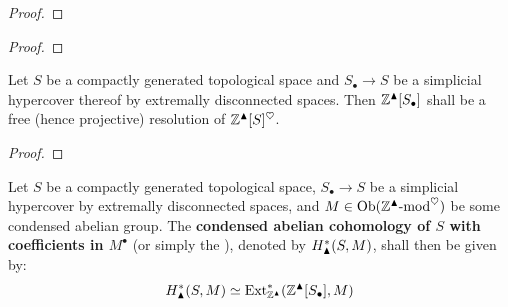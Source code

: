             \begin{lemma} \label{lemma: simplical_hypercovers_of_compacta_by_extremally_disconnected_spaces}
                
            \end{lemma}
                \begin{proof}
                    
                \end{proof}
            \begin{lemma}
                
            \end{lemma}
                \begin{proof}
                    
                \end{proof}
            \begin{proposition} \label{prop: free_resolutions_of_condensed_abelian_groups}
                Let $S$ be a compactly generated topological space and $S_{\bullet} \to S$ be a simplicial hypercover thereof by extremally disconnected spaces. Then $\mathbb{Z}^{\blacktriangle}[S_{\bullet}]$ shall be a free (hence projective) resolution of $\mathbb{Z}^{\blacktriangle}[S]^{\heartsuit}$.
            \end{proposition}
                \begin{proof}
                            
                \end{proof}
            \begin{definition} \label{def: condensed_abelian_sheaf_cohomology}
                Let $S$ be a compactly generated topological space, $S_{\bullet} \to S$ be a simplicial hypercover by extremally disconnected spaces, and $M \in \mathrm{Ob}(\mathbb{Z}^{\blacktriangle}\text{-}\mathrm{mod}^{\heartsuit})$ be some condensed abelian group. The \textbf{condensed abelian cohomology of $S$ with coefficients in $M^{\bullet}$} (or simply the ), denoted by $H^*_{\blacktriangle}(S, M)$, shall then be given by:
                    $$H^*_{\blacktriangle}(S, M) \simeq \mathrm{Ext}^*_{\mathbb{Z}^{\blacktriangle}}(\mathbb{Z}^{\blacktriangle}[S_{\bullet}], M)$$
            \end{definition}
            
